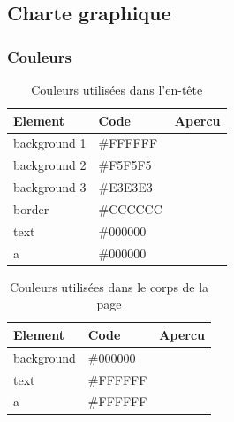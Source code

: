 \documentclass[letter, 11pt]{report}
\begin{document}
\subsection{Charte graphique}

\subsubsection{Couleurs}

\begin{table}[htpb]
	\caption{Couleurs utilisées dans l'en-tête}
	\begin{center}
		\begin{tabular}{|l|l|l|}
			\hline
			Element      & Code     & Apercu \\
			\hline
			background 1 & \#FFFFFF & \cellcolor[HTML]{FFFFFF} \\ \hline
			background 2 & \#F5F5F5 & \cellcolor[HTML]{F5F5F5} \\ \hline
			background 3 & \#E3E3E3 & \cellcolor[HTML]{E3E3E3} \\ \hline
			border       & \#CCCCCC & \cellcolor[HTML]{CCCCCC} \\ \hline
			text         & \#000000 & \cellcolor[HTML]{000000} \\ \hline
			a            & \#000000 & \cellcolor[HTML]{000000} \\ \hline
		\end{tabular}
	\end{center}
\end{table}

\begin{table}[htpb]
	\caption{Couleurs utilisées dans le corps de la page}
	\begin{center}
		\begin{tabular}{|l|l|l|}
			\hline
			Element    & Code     & Apercu \\
			\hline
			background & \#000000 & \cellcolor[HTML]{000000} \\ \hline
			text       & \#FFFFFF & \cellcolor[HTML]{FFFFFF} \\ \hline
			a          & \#FFFFFF & \cellcolor[HTML]{FFFFFF} \\ \hline
		\end{tabular}
	\end{center}
\end{table}
\end{document}
